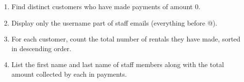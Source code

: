 \documentclass[12pt,a4paper]{article}
\newif\ifshowsolutions
\begin{document}
\begin{enumerate}


\item Find distinct customers who have made payments of amount 0.

\ifshowsolutions
\textbf{Solution:}
\begin{lstlisting}[language=SQL]
SELECT DISTINCT c.customer_id, c.first_name, c.last_name, c.email, p.amount
FROM customer c
JOIN payment p ON c.customer_id = p.customer_id
WHERE p.amount = 0;
\end{lstlisting}
\fi


\item Display only the username part of staff emails (everything before @).

\ifshowsolutions
\textbf{Solution:}
\begin{lstlisting}[language=SQL]
SELECT SUBSTR(email, 1, POSITION('@' IN email) - 1) AS username
FROM staff;
\end{lstlisting}
\fi


\item For each customer, count the total number of rentals they have made, sorted in descending order.

\ifshowsolutions
\textbf{Solution:}
\begin{lstlisting}[language=SQL]
SELECT c.first_name, c.last_name, COUNT(r.rental_id) AS total_rentals
FROM customer c
LEFT JOIN rental r ON c.customer_id = r.customer_id
GROUP BY c.customer_id
ORDER BY total_rentals DESC;
\end{lstlisting}
\fi


\item List the first name and last name of staff members along with the total amount collected by each in payments.

\ifshowsolutions
\textbf{Solution:}
\begin{lstlisting}[language=SQL]
SELECT s.first_name, s.last_name, SUM(p.amount) AS total_collected
FROM staff s
LEFT JOIN payment p ON s.staff_id = p.staff_id
GROUP BY s.staff_id;
\end{lstlisting}
\fi



\end{enumerate}
\end{document}
